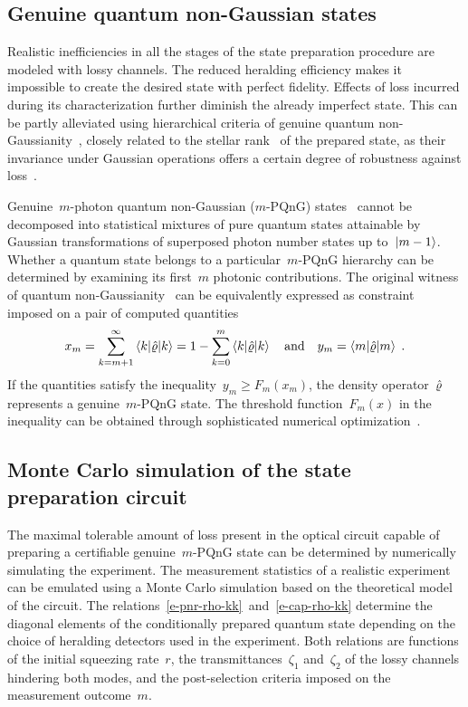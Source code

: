 \documentclass{article}
\begin{document}
%

\subsection*{Genuine quantum non-Gaussian states}

Realistic inefficiencies in all the stages of the state preparation procedure are modeled with lossy channels. The reduced heralding efficiency makes it impossible to create the desired state with perfect fidelity. Effects of loss incurred during its characterization further diminish the already imperfect state. This can be partly alleviated using hierarchical criteria of genuine quantum non-Gaussianity~\cite{lachman2019}, closely related to the stellar rank~\cite{chabaud2020,walschaers2021,fiurasek2022} of the prepared state, as their invariance under Gaussian operations offers a certain degree of robustness against loss~\cite{lachman2019}.

Genuine~$m$-photon quantum non-Gaussian ($m$-PQnG) states~\cite{lachman2019} cannot be decomposed into statistical mixtures of pure quantum states attainable by Gaussian transformations of superposed photon number states up to~${\ket{m - 1}}$. Whether a quantum state belongs to a particular~$m$-PQnG hierarchy can be determined by examining its first~$m$ photonic contributions. The original witness of quantum non-Gaussianity~\cite{lachman2019} can be equivalently expressed as constraint~\cite{fiurasek2022} imposed on a pair of computed quantities
%
\begin{equation}
  x_{m} 
    = \sum_{k = m + 1}^{\infty} 
      \braket{k | \hat{\varrho} | k}
    = 1 - \sum_{k = 0}^{m} 
      \braket{k | \hat{\varrho} | k}
  \quad\text{and}\quad
  y_{m} = \braket{m | \hat{\varrho} | m}
  \;\text{.}
\end{equation}
%
If the quantities satisfy the inequality~${y_{m} \geq F_{m} (x_{m})}$, the density operator~$\hat{\varrho}$ represents a genuine~$m$-PQnG state. The threshold function~$F_{m}(x)$ in the inequality can be obtained through sophisticated numerical optimization~\cite{lachman2019,fiurasek2022}.

%

\subsection*{Monte Carlo simulation of the state preparation circuit}

The maximal tolerable amount of loss present in the optical circuit capable of preparing a certifiable genuine~$m$-PQnG state can be determined by numerically simulating the experiment. The measurement statistics of a realistic experiment can be emulated using a Monte Carlo simulation based on the theoretical model of the circuit. The relations~\eqref{e-pnr-rho-kk}~and~\eqref{e-cap-rho-kk} determine the diagonal elements of the conditionally prepared quantum state depending on the choice of heralding detectors used in the experiment. Both relations are functions of the initial squeezing rate~$r$, the transmittances~$\zeta_{1}$ and~$\zeta_{2}$ of the lossy channels hindering both modes, and the post-selection criteria imposed on the measurement outcome~$m$.
\end{document}
